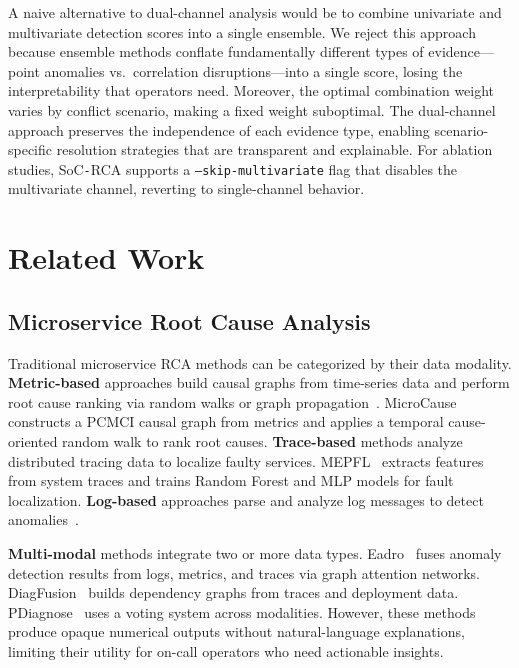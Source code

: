 \documentclass[a4paper,fleqn]{cas-dc}
\newcommand{\sysname}{SoC\texttt{-}RCA}
\begin{document}
A naive alternative to dual-channel analysis would be to combine univariate and multivariate detection scores into a single ensemble.  We reject this approach because ensemble methods conflate fundamentally different types of evidence---point anomalies vs.\ correlation disruptions---into a single score, losing the interpretability that operators need.  Moreover, the optimal combination weight varies by conflict scenario, making a fixed weight suboptimal.  The dual-channel approach preserves the independence of each evidence type, enabling scenario-specific resolution strategies that are transparent and explainable.  For ablation studies, \sysname{} supports a \texttt{--skip-multivariate} flag that disables the multivariate channel, reverting to single-channel behavior.


\section{Related Work}
\label{sec:related}

\subsection{Microservice Root Cause Analysis}

Traditional microservice RCA methods can be categorized by their data modality.  \textbf{Metric-based} approaches build causal graphs from time-series data and perform root cause ranking via random walks or graph propagation~\cite{9213058,8411065,6848128}.  MicroCause~\cite{9213058} constructs a PCMCI causal graph from metrics and applies a temporal cause-oriented random walk to rank root causes.  \textbf{Trace-based} methods analyze distributed tracing data to localize faulty services.  MEPFL~\cite{10.1145/3338906.3338961} extracts features from system traces and trains Random Forest and MLP models for fault localization.  \textbf{Log-based} approaches parse and analyze log messages to detect anomalies~\cite{10.5555/3367471.3367702}.

\textbf{Multi-modal} methods integrate two or more data types.  Eadro~\cite{10172617} fuses anomaly detection results from logs, metrics, and traces via graph attention networks.  DiagFusion~\cite{10165686} builds dependency graphs from traces and deployment data.  PDiagnose~\cite{9644910} uses a voting system across modalities.  However, these methods produce opaque numerical outputs without natural-language explanations, limiting their utility for on-call operators who need actionable insights.
\end{document}
